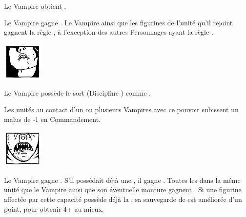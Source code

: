 \begin{multicols}{2}
\startpricelist

 Le Vampire obtient .

 Le Vampire gagne \awaken{\zombies, \direwolves, \batswarms, \greatbats}. Le Vampire ainsi que les figurines de l'unité qu'il rejoint gagnent la règle \swiftstride{}, à l'exception des autres Personnages ayant la règle \vampiric{}.

\endpricelist

\begin{center}\includegraphics[width=2cm]{logos/logo_lamia.png}\end{center}
\vspace*{-1.2cm}

\startpricelist

 Le Vampire possède le sort \lustspellfour{} (Discipline \lust{}) comme .

 Les unités au contact d'un ou plusieurs Vampires avec ce pouvoir subissent un malus de -1 en Commandement.

\endpricelist


\begin{center}\includegraphics[width=2cm]{logos/logo_strigoi.png}\end{center}
\vspace*{-1.4cm} %
\vspace*{-0.15cm} %
\startpricelist

 Le Vampire gagne . S'il possédait déjà une \regeneration{}, il gagne . Toutes les \ghouls{} dans la même unité que le Vampire ainsi que son éventuelle monture gagnent . Si une figurine affectée par cette capacité possède déjà la \regeneration{}, sa sauvegarde de \regeneration{} est améliorée d'un point, pour obtenir 4+ au mieux.


\end{multicols}

